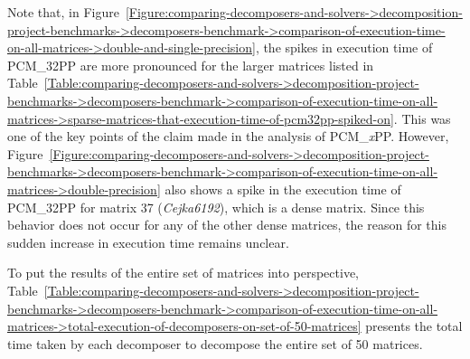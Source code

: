 Note that, in Figure~\ref{Figure:comparing-decomposers-and-solvers->decomposition-project-benchmarks->decomposers-benchmark->comparison-of-execution-time-on-all-matrices->double-and-single-precision}, the spikes in execution time of PCM\_32PP are more pronounced for the larger matrices listed in Table~\ref{Table:comparing-decomposers-and-solvers->decomposition-project-benchmarks->decomposers-benchmark->comparison-of-execution-time-on-all-matrices->sparse-matrices-that-execution-time-of-pcm32pp-spiked-on}. This was one of the key points of the claim made in the analysis of PCM\_\textit{x}PP. However, Figure~\ref{Figure:comparing-decomposers-and-solvers->decomposition-project-benchmarks->decomposers-benchmark->comparison-of-execution-time-on-all-matrices->double-precision} also shows a spike in the execution time of PCM\_32PP for matrix 37 (\textit{Cejka6192}), which is a dense matrix. Since this behavior does not occur for any of the other dense matrices, the reason for this sudden increase in execution time remains unclear.

To put the results of the entire set of matrices into perspective, Table~\ref{Table:comparing-decomposers-and-solvers->decomposition-project-benchmarks->decomposers-benchmark->comparison-of-execution-time-on-all-matrices->total-execution-of-decomposers-on-set-of-50-matrices} presents the total time taken by each decomposer to decompose the entire set of 50 matrices.

